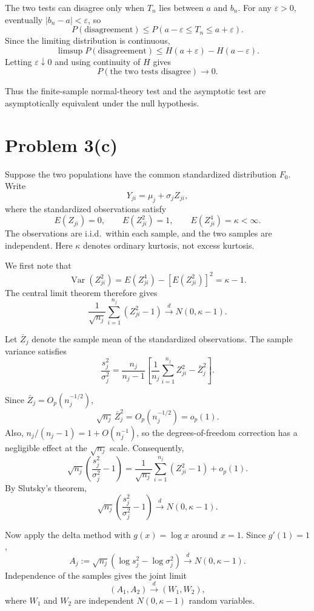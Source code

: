 \documentclass[11pt]{article}
\begin{document}
The two tests can disagree only when $T_n$
lies between $a$ and $b_n$. For any
$\varepsilon>0$, eventually
$|b_n-a|<\varepsilon$, so
\[
P(\text{disagreement})
\leq
P(a-\varepsilon\leq T_n\leq a+\varepsilon).
\]
Since the limiting distribution is continuous,
\[
\limsup P(\text{disagreement})
\leq
H(a+\varepsilon)-H(a-\varepsilon).
\]
Letting $\varepsilon\downarrow0$ and using
continuity of $H$ gives
\[
\boxed{
P(\text{the two tests disagree})\longrightarrow0.
}
\]

Thus the finite-sample normal-theory test and
the asymptotic test are asymptotically
equivalent under the null hypothesis.
\section*{Problem 3(c)}

Suppose the two populations have the common
standardized distribution $F_0$. Write
\[
Y_{ji}=\mu_j+\sigma_j Z_{ji},
\]
where the standardized observations satisfy
\[
E(Z_{ji})=0,
\qquad
E(Z_{ji}^2)=1,
\qquad
E(Z_{ji}^4)=\kappa<\infty.
\]
The observations are i.i.d.\ within each sample,
and the two samples are independent.
Here $\kappa$ denotes ordinary kurtosis,
not excess kurtosis.

We first note that
\[
\operatorname{Var}(Z_{ji}^2)
=E(Z_{ji}^4)-[E(Z_{ji}^2)]^2
=\kappa-1.
\]
The central limit theorem therefore gives
\[
\frac{1}{\sqrt{n_j}}
\sum_{i=1}^{n_j}(Z_{ji}^2-1)
\xrightarrow{d}N(0,\kappa-1).
\]

Let $\bar Z_j$ denote the sample mean of the
standardized observations. The sample variance
satisfies
\[
\frac{s_j^2}{\sigma_j^2}
=
\frac{n_j}{n_j-1}
\left[
\frac{1}{n_j}\sum_{i=1}^{n_j}Z_{ji}^2
-\bar Z_j^2
\right].
\]

Since $\bar Z_j=O_p(n_j^{-1/2})$,
\[
\sqrt{n_j}\,\bar Z_j^2
=O_p(n_j^{-1/2})
=o_p(1).
\]
Also, $n_j/(n_j-1)=1+O(n_j^{-1})$, so the
degrees-of-freedom correction has a negligible
effect at the $\sqrt{n_j}$ scale.
Consequently,
\[
\sqrt{n_j}
\left(\frac{s_j^2}{\sigma_j^2}-1\right)
=
\frac{1}{\sqrt{n_j}}
\sum_{i=1}^{n_j}(Z_{ji}^2-1)
+o_p(1).
\]
By Slutsky's theorem,
\[
\sqrt{n_j}
\left(\frac{s_j^2}{\sigma_j^2}-1\right)
\xrightarrow{d}N(0,\kappa-1).
\]

Now apply the delta method with $g(x)=\log x$
around $x=1$. Since $g'(1)=1$,
\[
A_j
:=
\sqrt{n_j}
\left(\log s_j^2-\log\sigma_j^2\right)
\xrightarrow{d}N(0,\kappa-1).
\]
Independence of the samples gives the joint limit
\[
(A_1,A_2)\xrightarrow{d}(W_1,W_2),
\]
where $W_1$ and $W_2$ are independent
$N(0,\kappa-1)$ random variables.
\end{document}

